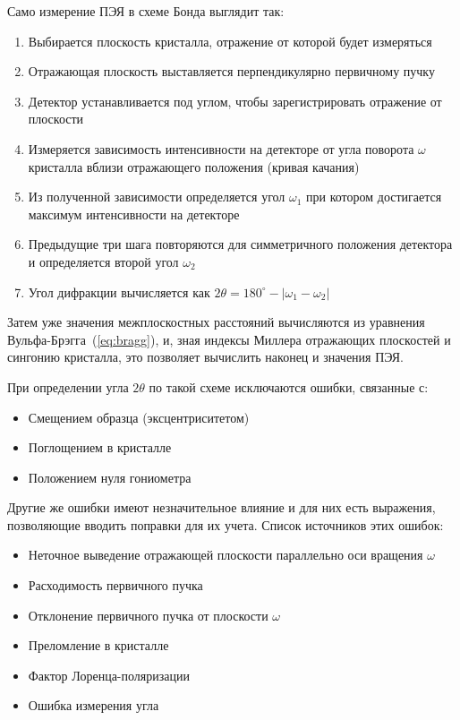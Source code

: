 \documentclass[a4paper,14pt]{extarticle}
\newcommand{\degree}{^\circ}
\begin{document}
Само измерение ПЭЯ в схеме Бонда выглядит так:
\begin{enumerate}
    \item Выбирается плоскость кристалла, отражение от которой будет измеряться
    \item Отражающая плоскость выставляется перпендикулярно первичному пучку
    \item Детектор устанавливается под углом, чтобы зарегистрировать отражение от плоскости
    \item Измеряется зависимость интенсивности на детекторе от угла поворота $\omega$ кристалла вблизи отражающего положения (кривая качания)
    \item Из полученной зависимости определяется угол $\omega_1$ при котором достигается максимум интенсивности на детекторе
    \item Предыдущие три шага повторяются для симметричного положения детектора и определяется второй угол $\omega_2$
    \item Угол дифракции вычисляется как $2\theta=180\degree-|\omega_1-\omega_2|$
\end{enumerate}
Затем уже значения межплоскостных расстояний вычисляются из уравнения Вульфа-Брэгга~(\ref{eq:bragg}), и, зная индексы Миллера отражающих плоскостей и сингонию кристалла, это позволяет вычислить наконец и значения ПЭЯ.

При определении угла $2\theta$ по такой схеме исключаются ошибки, связанные с:
\begin{itemize}
    \item Смещением образца (эксцентриситетом)
    \item Поглощением в кристалле
    \item Положением нуля гониометра
\end{itemize}
Другие же ошибки имеют незначительное влияние и для них есть выражения, позволяющие вводить поправки для их учета.
Список источников этих ошибок:
\begin{itemize}
    \item Неточное выведение отражающей плоскости параллельно оси вращения $\omega$
    \item Расходимость первичного пучка
    \item Отклонение первичного пучка от плоскости $\omega$
    \item Преломление в кристалле
    \item Фактор Лоренца-поляризации
    \item Ошибка измерения угла
\end{itemize}
\end{document}
